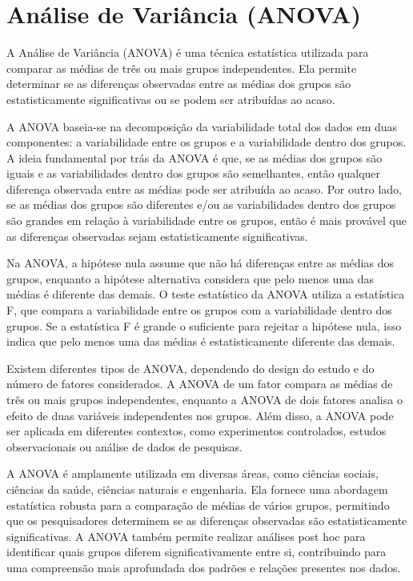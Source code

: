 \chapter{Análise de Variância (ANOVA)}

A Análise de Variância (ANOVA) é uma técnica estatística utilizada para comparar as médias de três ou mais grupos independentes. Ela permite determinar se as diferenças observadas entre as médias dos grupos são estatisticamente significativas ou se podem ser atribuídas ao acaso.

A ANOVA baseia-se na decomposição da variabilidade total dos dados em duas componentes: a variabilidade entre os grupos e a variabilidade dentro dos grupos. A ideia fundamental por trás da ANOVA é que, se as médias dos grupos são iguais e as variabilidades dentro dos grupos são semelhantes, então qualquer diferença observada entre as médias pode ser atribuída ao acaso. Por outro lado, se as médias dos grupos são diferentes e/ou as variabilidades dentro dos grupos são grandes em relação à variabilidade entre os grupos, então é mais provável que as diferenças observadas sejam estatisticamente significativas.

Na ANOVA, a hipótese nula assume que não há diferenças entre as médias dos grupos, enquanto a hipótese alternativa considera que pelo menos uma das médias é diferente das demais. O teste estatístico da ANOVA utiliza a estatística F, que compara a variabilidade entre os grupos com a variabilidade dentro dos grupos. Se a estatística F é grande o suficiente para rejeitar a hipótese nula, isso indica que pelo menos uma das médias é estatisticamente diferente das demais.

Existem diferentes tipos de ANOVA, dependendo do design do estudo e do número de fatores considerados. A ANOVA de um fator compara as médias de três ou mais grupos independentes, enquanto a ANOVA de dois fatores analisa o efeito de duas variáveis independentes nos grupos. Além disso, a ANOVA pode ser aplicada em diferentes contextos, como experimentos controlados, estudos observacionais ou análise de dados de pesquisas.

A ANOVA é amplamente utilizada em diversas áreas, como ciências sociais, ciências da saúde, ciências naturais e engenharia. Ela fornece uma abordagem estatística robusta para a comparação de médias de vários grupos, permitindo que os pesquisadores determinem se as diferenças observadas são estatisticamente significativas. A ANOVA também permite realizar análises post hoc para identificar quais grupos diferem significativamente entre si, contribuindo para uma compreensão mais aprofundada dos padrões e relações presentes nos dados.